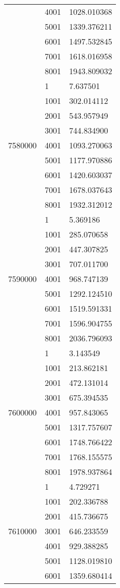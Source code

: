 \begin{table}[htb!]
\begin{tabular}{lll}
 & 4001 & 1028.010368 \\
 & 5001 & 1339.376211 \\
 & 6001 & 1497.532845 \\
 & 7001 & 1618.016958 \\
 & 8001 & 1943.809032 \\
\multirow[c]{9}{*}{7580000} & 1 & 7.637501 \\
 & 1001 & 302.014112 \\
 & 2001 & 543.957949 \\
 & 3001 & 744.834900 \\
 & 4001 & 1093.270063 \\
 & 5001 & 1177.970886 \\
 & 6001 & 1420.603037 \\
 & 7001 & 1678.037643 \\
 & 8001 & 1932.312012 \\
\multirow[c]{9}{*}{7590000} & 1 & 5.369186 \\
 & 1001 & 285.070658 \\
 & 2001 & 447.307825 \\
 & 3001 & 707.011700 \\
 & 4001 & 968.747139 \\
 & 5001 & 1292.124510 \\
 & 6001 & 1519.591331 \\
 & 7001 & 1596.904755 \\
 & 8001 & 2036.796093 \\
\multirow[c]{9}{*}{7600000} & 1 & 3.143549 \\
 & 1001 & 213.862181 \\
 & 2001 & 472.131014 \\
 & 3001 & 675.394535 \\
 & 4001 & 957.843065 \\
 & 5001 & 1317.757607 \\
 & 6001 & 1748.766422 \\
 & 7001 & 1768.155575 \\
 & 8001 & 1978.937864 \\
\multirow[c]{9}{*}{7610000} & 1 & 4.729271 \\
 & 1001 & 202.336788 \\
 & 2001 & 415.736675 \\
 & 3001 & 646.233559 \\
 & 4001 & 929.388285 \\
 & 5001 & 1128.019810 \\
 & 6001 & 1359.680414 \\

\end{tabular}
\end{table}
